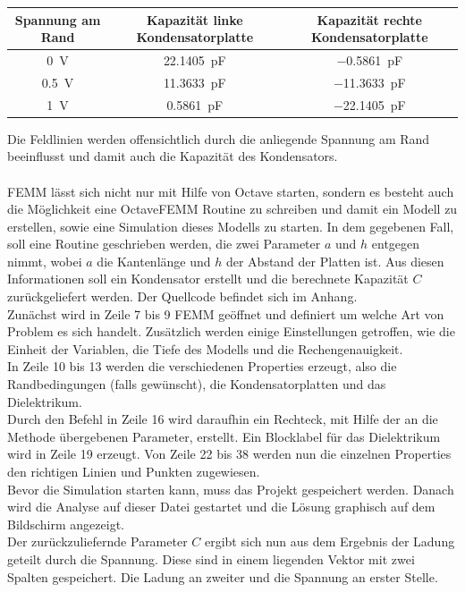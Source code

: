 \begin{table}[h]
	\centering
	\begin{tabular}[h]{c|c c}
		Spannung am Rand & Kapazität linke Kondensatorplatte & Kapazität rechte Kondensatorplatte \\
		\hline
		\SI{0}{\volt} &  \SI{22,1405}{\pico\farad} & \SI{-0,5861}{\pico\farad} \\
		\SI{0,5}{\volt} & \SI{11,3633}{\pico\farad} & \SI{-11,3633}{\pico\farad} \\
		\SI{1}{\volt} &  \SI{0,5861}{\pico\farad} & \SI{-22,1405}{\pico\farad}
	\end{tabular}
\end{table}
\vspace*{1.5cm}
Die Feldlinien werden offensichtlich durch die anliegende Spannung am Rand beeinflusst und damit auch die Kapazität des Kondensators.
\\
\\
FEMM lässt sich nicht nur mit Hilfe von Octave starten, sondern es besteht auch die Möglichkeit eine OctaveFEMM Routine zu schreiben und damit ein Modell zu erstellen, sowie eine Simulation dieses Modells zu starten. In dem gegebenen Fall, soll eine Routine geschrieben werden, die zwei Parameter $a$ und $h$ entgegen nimmt, wobei $a$ die Kantenlänge und $h$ der Abstand der Platten ist. Aus diesen Informationen soll ein Kondensator erstellt und die berechnete Kapazität $C$ zurückgeliefert werden. Der Quellcode befindet sich im Anhang. \\ 
\newpage
Zunächst wird in Zeile 7 bis 9 FEMM geöffnet und definiert um welche Art von Problem es sich handelt. Zusätzlich werden einige Einstellungen getroffen, wie die Einheit der Variablen, die Tiefe des Modells und die Rechengenauigkeit. \\ 
In Zeile 10 bis 13 werden die verschiedenen Properties erzeugt, also die Randbedingungen (falls gewünscht), die Kondensatorplatten und das Dielektrikum. \\
Durch den Befehl in Zeile 16 wird daraufhin ein Rechteck, mit Hilfe der an die Methode übergebenen Parameter,  erstellt. Ein Blocklabel für das Dielektrikum wird in Zeile 19 erzeugt. Von Zeile 22 bis 38 werden nun die einzelnen Properties den richtigen Linien und Punkten zugewiesen.\\
Bevor die Simulation starten kann, muss das Projekt gespeichert werden. Danach wird die Analyse auf dieser Datei gestartet und die Lösung graphisch auf dem Bildschirm angezeigt.\\
Der zurückzuliefernde Parameter $C$ ergibt sich nun aus dem Ergebnis der Ladung geteilt durch die Spannung. Diese sind in einem liegenden Vektor mit zwei Spalten gespeichert. Die Ladung an zweiter und die Spannung an erster Stelle. 